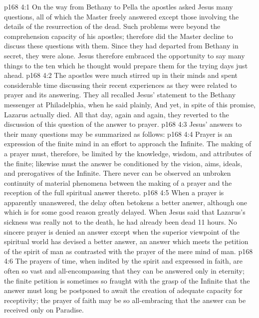 \vs p168 4:1 On the way from Bethany to Pella the apostles asked Jesus many questions, all of which the Master freely answered except those involving the details of the resurrection of the dead. Such problems were beyond the comprehension capacity of his apostles; therefore did the Master decline to discuss these questions with them. Since they had departed from Bethany in secret, they were alone. Jesus therefore embraced the opportunity to say many things to the ten which he thought would prepare them for the trying days just ahead.
\vs p168 4:2 The apostles were much stirred up in their minds and spent considerable time discussing their recent experiences as they were related to prayer and its answering. They all recalled Jesus’ statement to the Bethany messenger at Philadelphia, when he said plainly,  And yet, in spite of this promise, Lazarus actually died. All that day, again and again, they reverted to the discussion of this question of the answer to prayer.
\vs p168 4:3 Jesus’ answers to their many questions may be summarized as follows:
\vs p168 4:4 \bibnobreakspace Prayer is an expression of the finite mind in an effort to approach the Infinite. The making of a prayer must, therefore, be limited by the knowledge, wisdom, and attributes of the finite; likewise must the answer be conditioned by the vision, aims, ideals, and prerogatives of the Infinite. There never can be observed an unbroken continuity of material phenomena between the making of a prayer and the reception of the full spiritual answer thereto.
\vs p168 4:5 \bibnobreakspace When a prayer is apparently unanswered, the delay often betokens a better answer, although one which is for some good reason greatly delayed. When Jesus said that Lazarus’s sickness was really not to the death, he had already been dead 11 hours. No sincere prayer is denied an answer except when the superior viewpoint of the spiritual world has devised a better answer, an answer which meets the petition of the spirit of man as contrasted with the prayer of the mere mind of man.
\vs p168 4:6 \bibnobreakspace The prayers of time, when indited by the spirit and expressed in faith, are often so vast and all\hyp{}encompassing that they can be answered only in eternity; the finite petition is sometimes so fraught with the grasp of the Infinite that the answer must long be postponed to await the creation of adequate capacity for receptivity; the prayer of faith may be so all\hyp{}embracing that the answer can be received only on Paradise.
